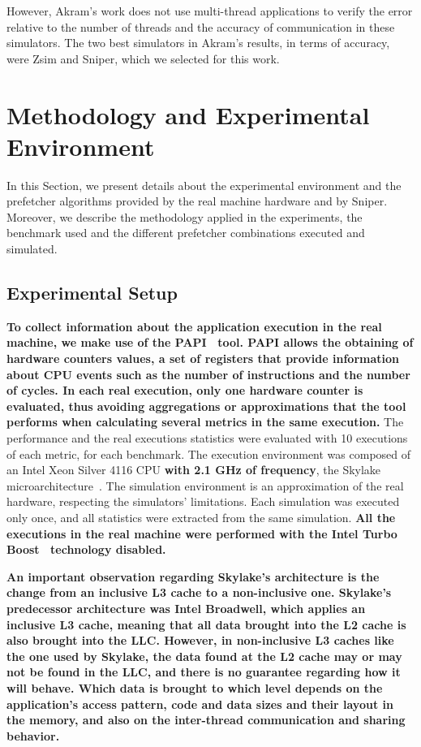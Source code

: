 \documentclass[AMA,final,STIX1COL]{WileyNJD-v2}
\newcommand\new[1]{{\color{red}\textbf{#1}}}
\begin{document}
However, Akram's work does not use multi-thread applications to verify the error relative to the number of threads and the accuracy of communication in these simulators.
The two best simulators in Akram's results, in terms of accuracy, were Zsim and Sniper, which we selected for this work.

\section{Methodology and Experimental Environment}\label{sec:experiments}
In this Section, we present details about the experimental environment and the prefetcher algorithms provided by the real machine hardware and by Sniper.
Moreover, we describe the methodology applied in the experiments, the benchmark used and the different prefetcher combinations executed and simulated.

\subsection{Experimental Setup}
\label{subsec:exp-setup}

\new{To collect information about the application execution in the real machine, we make use of the PAPI~\cite{terpstra2010papi} tool.
PAPI allows the obtaining of hardware counters values, a set of registers that provide information about CPU events such as the number of instructions and the number of cycles.
In each real execution, only one hardware counter is evaluated, thus avoiding aggregations or approximations that the tool performs when calculating several metrics in the same execution.}
The performance and the real executions statistics were evaluated with 10 executions of each metric, for each benchmark.
The execution environment was composed of an Intel Xeon Silver 4116 CPU \new{with 2.1 GHz of frequency}, the Skylake microarchitecture~\cite{doweck2017skylake}.
The simulation environment is an approximation of the real hardware, respecting the simulators' limitations.
Each simulation was executed only once, and all statistics were extracted from the same simulation.
\new{All the executions in the real machine were performed with the Intel Turbo Boost~\cite{rotem2012turbo} technology disabled.}

\new{An important observation regarding Skylake's architecture is the change from an inclusive L3 cache to a non-inclusive one.
Skylake's predecessor architecture was Intel Broadwell, which applies an inclusive L3 cache, meaning that all data brought into the L2 cache is also brought into the LLC.
However, in non-inclusive L3 caches like the one used by Skylake, the data found at the L2 cache may or may not be found in the LLC, and there is no guarantee regarding how it will behave.
Which data is brought to which level depends on the application's access pattern, code and data sizes and their layout in the memory, and also on the inter-thread communication and sharing behavior.
}
\end{document}
